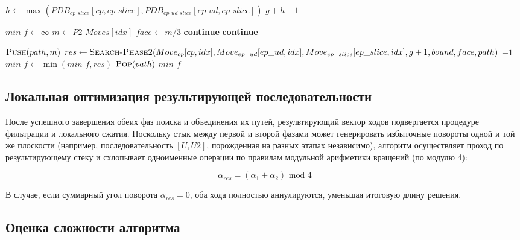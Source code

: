 \documentclass{article}
\begin{document}
\begin{algorithm}[H]
\caption{Поиск второй фазы алгоритма IDA*}
\label{alg:search-p2}
\begin{algorithmic}[1]
\State $h \gets \max(PDB_{cp\_slice}[cp, ep\_slice], PDB_{ep\_ud\_slice}[ep\_ud, ep\_slice])$
    \State\Return $g + h$ 
\EndIf
{} 
    \State\Return $-1$ 
\EndIf
    
\State $min\_f \gets \infty$
    \State $m \gets P2\_Moves[idx]$
    \State $face \gets m / 3$
        \State\textbf{continue} 
    \EndIf
        \State\textbf{continue} 
    \EndIf
        
    \State $\Call{Push}{path, m}$
    \State $res \gets \Call{Search-Phase2}{Move_{cp}[cp, idx], Move_{ep\_ud}[ep\_ud, idx], Move_{ep\_slice}[ep\_slice, idx], g + 1, bound, face, path}$
        \State\Return $-1$ 
    \EndIf
    \State $min\_f \gets \min(min\_f, res)$
    \State $\Call{Pop}{path}$
\EndFor
\State\Return $min\_f$
\EndProcedure
\end{algorithmic}
\end{algorithm}

\subsection{Локальная оптимизация результирующей последовательности}
После успешного завершения обеих фаз поиска и объединения их путей, результирующий вектор ходов подвергается процедуре фильтрации и локального сжатия. Поскольку стык между первой и второй фазами может генерировать избыточные повороты одной и той же плоскости (например, последовательность $[U, U2]$, порожденная на разных этапах независимо), алгоритм осуществляет проход по результирующему стеку и схлопывает одноименные операции по правилам модульной арифметики вращений (по модулю 4):

\begin{equation}
\alpha_{res} = (\alpha_1 + \alpha_2) \text{ mod } 4
\end{equation}

В случае, если суммарный угол поворота $\alpha_{res} = 0$, оба хода полностью аннулируются, уменьшая итоговую длину решения.

\subsection{Оценка сложности алгоритма}
\end{document}
